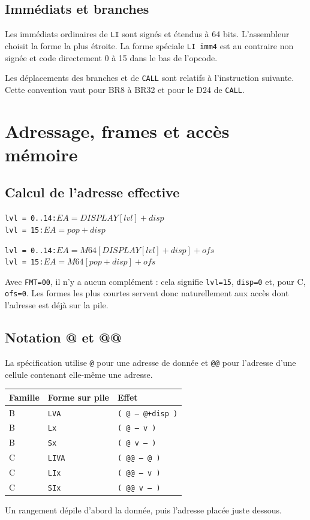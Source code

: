 \documentclass[10pt,a4paper,twoside,openany]{book}
\newcommand{\code}[1]{\texttt{#1}}
\newcommand{\stack}[1]{\texttt{#1}}
\begin{document}
\section{Immédiats et branches}
Les immédiats ordinaires de \texttt{LI} sont signés et étendus à 64 bits. L'assembleur choisit la forme la plus étroite. La forme spéciale \texttt{LI imm4} est au contraire non signée et code directement 0 à 15 dans le bas de l'opcode.

Les déplacements des branches et de \texttt{CALL} sont relatifs à l'instruction suivante. Cette convention vaut pour BR8 à BR32 et pour le D24 de \texttt{CALL}.

\chapter{Adressage, frames et accès mémoire}
\section{Calcul de l'adresse effective}
\begin{architecturebox}
\texttt{lvl = 0..14:}\quad $EA = DISPLAY[lvl] + disp$\\
\texttt{lvl = 15:}\quad $EA = pop + disp$
\end{architecturebox}
\begin{architecturebox}
\texttt{lvl = 0..14:}\quad $EA = M64[DISPLAY[lvl] + disp] + ofs$\\
\texttt{lvl = 15:}\quad $EA = M64[pop + disp] + ofs$
\end{architecturebox}

Avec \code{FMT=00}, il n'y a aucun complément : cela signifie \code{lvl=15}, \code{disp=0} et, pour C, \code{ofs=0}. Les formes les plus courtes servent donc naturellement aux accès dont l'adresse est déjà sur la pile.

\section{Notation @ et @@}
La spécification utilise \code{@} pour une adresse de donnée et \code{@@} pour l'adresse d'une cellule contenant elle-même une adresse.
\begin{center}
\begin{tabularx}{\linewidth}{@{}l l X@{}}
\toprule
Famille & Forme sur pile & Effet\\ \midrule
B & \texttt{LVA} & \stack{( @ -- @+disp )}\\
B & \texttt{Lx} & \stack{( @ -- v )}\\
B & \texttt{Sx} & \stack{( @ v -- )}\\
C & \texttt{LIVA} & \stack{( @@ -- @ )}\\
C & \texttt{LIx} & \stack{( @@ -- v )}\\
C & \texttt{SIx} & \stack{( @@ v -- )}\\
\bottomrule
\end{tabularx}
\end{center}
Un rangement dépile d'abord la donnée, puis l'adresse placée juste dessous.
\end{document}
